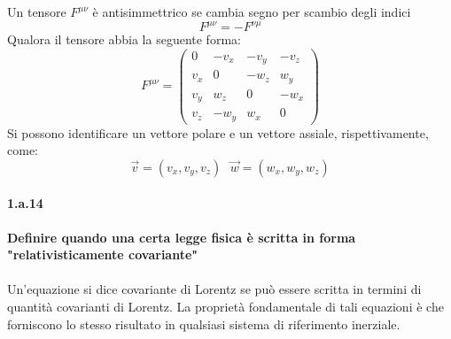 \documentclass[twoside]{article}
\begin{document}
Un tensore $F^{\mu \nu}$ è antisimmettrico se cambia segno per scambio degli indici
\begin{equation*}
    F^{\mu \nu}=-F^{\nu \mu}
\end{equation*}
Qualora il tensore abbia la seguente forma:
\begin{equation*}
    F^{\mu \nu}=\begin{pmatrix}
    0 & -v_x & -v_y & - v_z \\
    v_x & 0 & -w_z & w_y \\
    v_y & w_z & 0 & -w_x \\
    v_z & -w_y & w_x & 0
    \end{pmatrix}
\end{equation*}
Si possono identificare un vettore polare e un vettore assiale, rispettivamente, come:
\begin{equation*}
    \vec{v}=(v_x , v_y , v_z) \ \ \ \vec{w}=(w_x , w_y , w_z)
\end{equation*}

\paragraph{1.a.14} \textbf{Definire quando una certa legge fisica è scritta in forma "relativisticamente
covariante"} \\ \\
Un'equazione si dice covariante di Lorentz se può essere scritta in termini di quantità covarianti di Lorentz. La proprietà fondamentale di tali equazioni è che forniscono lo stesso risultato in qualsiasi sistema di riferimento inerziale.

\end{document}
